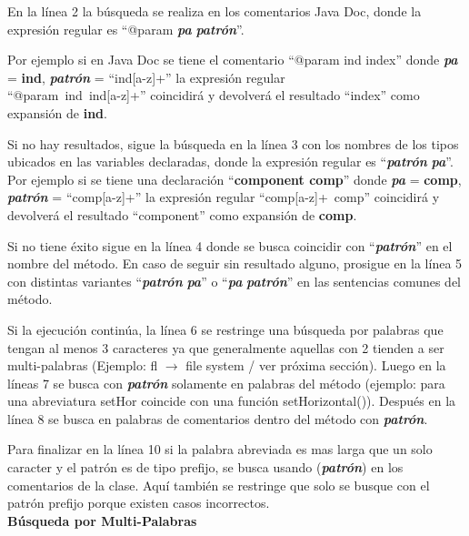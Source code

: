 \documentclass[a4paper,12pt]{report}
\makeatletter
\newcommand{\at}{\makeatletter @\makeatother}%
\makeatother
\begin{document}
En la línea 2 la búsqueda se realiza en los comentarios Java Doc, donde la expresión regular es “\at param \textit{\textbf{pa}} \textit{\textbf{patrón}}”. 

Por ejemplo si en Java Doc se tiene el comentario “\at param ind index” donde \textit{\textbf{pa}} = \textbf{ind}, \textit{\textbf{patrón}} = “ind[a-z]+”  la expresión regular \\ \mbox{“\at param ind ind[a-z]+”} coincidirá y devolverá el resultado  “index” como expansión de \textbf{ind}.

Si no hay resultados, sigue la búsqueda en la línea 3 con los nombres de los tipos ubicados en las variables declaradas, donde la expresión regular es “\textit{\textbf{patrón}} \textit{\textbf{pa}}”. Por ejemplo si se tiene una declaración “\textbf{component comp}” donde \textit{\textbf{pa}} = \textbf{comp}, \textit{\textbf{patrón}} = “comp[a-z]+”  la expresión regular \mbox{“comp[a-z]+ comp”} coincidirá y devolverá el resultado  “component” como expansión de \textbf{comp}.

Si no tiene éxito sigue en la línea 4 donde se busca coincidir con “\textit{\textbf{patrón}}” en el nombre del método. En caso de seguir sin resultado alguno, prosigue en la línea 5 con distintas variantes “\textit{\textbf{patrón}} \textit{\textbf{pa}}” o “\textit{\textbf{pa}} \textit{\textbf{patrón}}” en las sentencias comunes del método. 


Si la ejecución continúa, la línea 6 se restringe una búsqueda por palabras que tengan al menos 3 caracteres ya que generalmente aquellas con 2 tienden a ser multi-palabras (Ejemplo: \textsf{fl $\rightarrow$ file system} / ver próxima sección). Luego en la líneas 7 se busca con \textit{\textbf{patrón}} solamente en palabras del método (ejemplo: para una abreviatura \textsf{setHor} coincide con una función \textsf{setHorizontal()}). Después en la línea 8 se busca en palabras de comentarios dentro del método con \textit{\textbf{patrón}}.


Para finalizar en la línea 10 si la palabra abreviada es mas larga que un solo caracter y el patrón es de tipo prefijo, se busca usando (\textit{\textbf{patrón}}) en los comentarios de la clase. Aquí también se restringe que solo se busque con el patrón prefijo porque existen casos incorrectos\cite{EZH08}.\\

\noindent \textbf{Búsqueda por Multi-Palabras\\}
\end{document}
